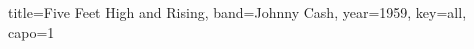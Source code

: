 \documentclass{skrul-leadsheet}
\begin{document}
\begin{song}[transpose-capo=true]{title={Five Feet High and Rising}, band={Johnny Cash}, year={1959}, key={all}, capo={1}}



\end{song}
\end{document}
